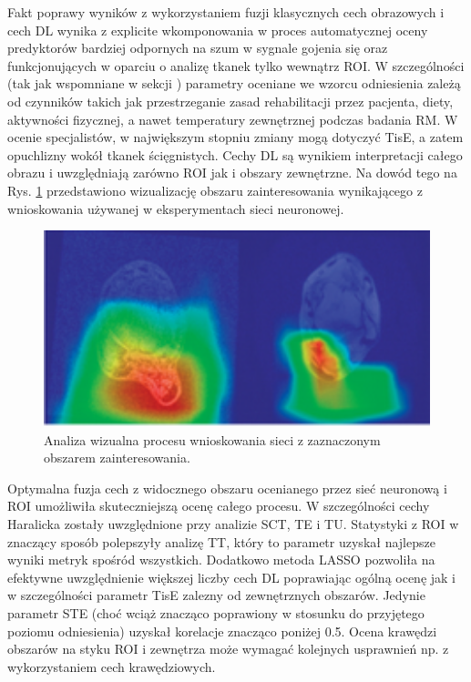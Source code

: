 Fakt poprawy wyników z wykorzystaniem fuzji klasycznych cech obrazowych i cech DL wynika z explicite wkomponowania w proces automatycznej oceny predyktorów bardziej odpornych na szum w sygnale gojenia się oraz funkcjonujących w oparciu o analizę tkanek tylko wewnątrz ROI. W szczególności (tak jak wspomniane w sekcji ) parametry oceniane we wzorcu odniesienia zależą od czynników takich jak przestrzeganie zasad rehabilitacji przez pacjenta, diety, aktywności fizycznej, a nawet temperatury zewnętrznej podczas badania RM. W ocenie specjalistów, w największym stopniu zmiany mogą dotyczyć TisE, a zatem opuchlizny wokół tkanek ścięgnistych. Cechy DL są wynikiem interpretacji całego obrazu i uwzględniają zarówno ROI jak i obszary zewnętrzne. Na dowód tego na Rys. \ref{fig:XAI} przedstawiono wizualizację obszaru zainteresowania wynikającego z wnioskowania używanej w eksperymentach sieci neuronowej.       
\begin{figure}[h]
	\centering
	\includegraphics[width=1\textwidth]{figures/XAI.png}
	\caption{Analiza wizualna procesu wnioskowania sieci z zaznaczonym obszarem zainteresowania.}\label{fig:XAI}
\end{figure}

Optymalna fuzja cech z widocznego obszaru ocenianego przez sieć neuronową i ROI umożliwiła skuteczniejszą ocenę całego procesu. W szczególności cechy Haralicka zostały uwzględnione przy analizie SCT, TE i TU. Statystyki z ROI w znaczący sposób polepszyły analizę TT, który to parametr uzyskał najlepsze wyniki metryk spośród wszystkich. Dodatkowo metoda LASSO pozwoliła na efektywne uwzględnienie większej liczby cech DL poprawiając ogólną ocenę jak i w szczególności parametr TisE zalezny od zewnętrznych obszarów. Jedynie parametr STE (choć wciąż znacząco poprawiony w stosunku do przyjętego poziomu odniesienia) uzyskał korelacje znacząco poniżej 0.5. Ocena krawędzi obszarów na styku ROI i zewnętrza może wymagać kolejnych usprawnień np. z wykorzystaniem cech krawędziowych.
 
